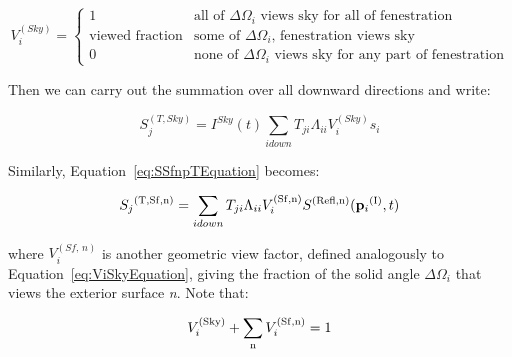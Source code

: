 \begin{equation}
V_i^{(Sky)} = \left\{
    \begin{array}{rl}
      1                      & \text{all of } \Delta\Omega_i \text{ views sky for all of fenestration} \\
      \text{viewed fraction} & \text{some of } \Delta\Omega_i \text{, fenestration views sky} \\
      0                      & \text{none of } \Delta\Omega_i \text{ views sky for any part of fenestration}
    \end{array}
  \right.
\label{eq:ViSkyEquation}
\end{equation}

Then we can carry out the summation over all downward directions and write:

\begin{equation}
  S_j^{(T,Sky)} = I^{Sky}(t)\sum_{i down} T_{ji} \Lambda_{ii} V_i^{(Sky)} {s_i}
\label{eq:SjTSkyEquation}
\end{equation}

Similarly, Equation~\ref{eq:SSfnpTEquation} becomes:

\begin{equation}
{S_j}^{{\rm{(T, Sf, n)}}} = \sum\limits_{i{\rm{ }}down} {{T_{ji}}{\Lambda_{ii}}V_i^{{\rm{(Sf, n)}}}{S^{{\rm{(Refl, n)}}}}({{\bf{p}}_i}^{{\rm{(I)}}},t)}
\label{eq:SjTSfnEquation}
\end{equation}

where \(V_{i}^{(Sf,\, n)}\) is another geometric view factor, defined analogously to Equation~\ref{eq:ViSkyEquation}, giving the fraction of the solid angle \(\Delta {\Omega_i}\) that views the exterior surface \emph{n}. Note that:

\begin{equation}
V_i^{{\rm{(Sky)}}} + \sum\limits_{\rm{n}} {V_i^{{\rm{(Sf, n)}}}}  = 1
\end{equation}

